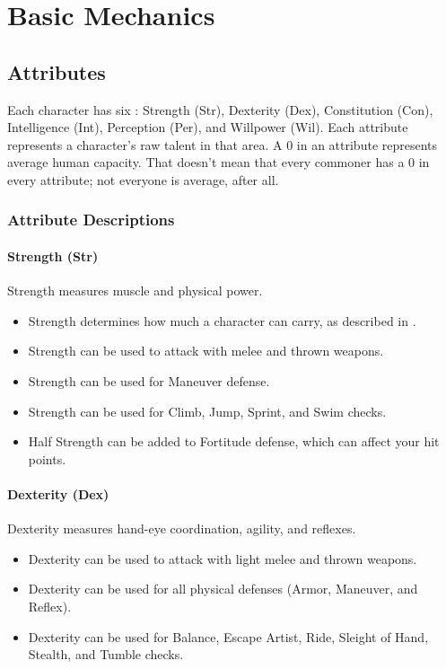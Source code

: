 \chapter{Basic Mechanics}

\section{Attributes}
Each character has six : Strength (Str), Dexterity (Dex), Constitution (Con), Intelligence (Int), Perception (Per), and Willpower (Wil).
Each attribute represents a character's raw talent in that area.
A 0 in an attribute represents average human capacity.
That doesn't mean that every commoner has a 0 in every attribute; not everyone is average, after all.

\subsection{Attribute Descriptions}

\subsubsection{Strength (Str)}\label{Strength}
Strength measures muscle and physical power.
\begin{itemize}
    \item Strength determines how much a character can carry, as described in .
    \item Strength can be used to attack with melee and thrown weapons.
    \item Strength can be used for Maneuver defense.
    \item Strength can be used for Climb, Jump, Sprint, and Swim checks.
    \item Half Strength can be added to Fortitude defense, which can affect your hit points.
\end{itemize}

\subsubsection{Dexterity (Dex)}\label{Dexterity}
Dexterity measures hand-eye coordination, agility, and reflexes.
\begin{itemize}
    \item Dexterity can be used to attack with light melee and thrown weapons.
    \item Dexterity can be used for all physical defenses (Armor, Maneuver, and Reflex).
    \item Dexterity can be used for Balance, Escape Artist, Ride, Sleight of Hand, Stealth, and Tumble checks.
\end{itemize}

